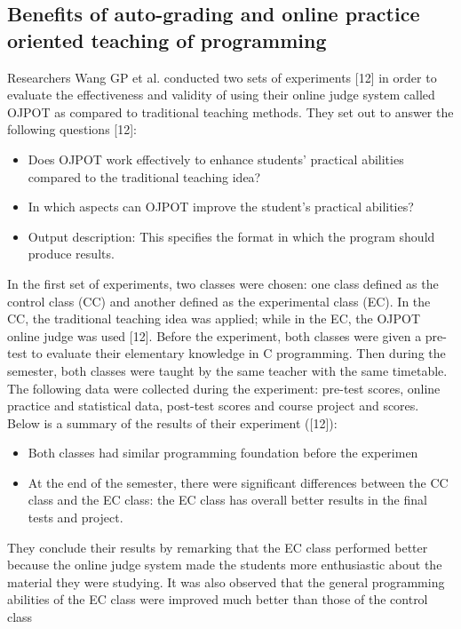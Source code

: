 \documentclass[12pt]{article}
\begin{document}
	\subsection{Benefits of auto-grading and online practice oriented teaching of programming}
		Researchers Wang GP et al. conducted two sets of experiments [12] in order to evaluate the
	effectiveness and validity of using their online judge system called OJPOT as compared to
	traditional teaching methods. They set out to answer the following questions [12]:
		\begin{itemize}
			\item  Does OJPOT work effectively to enhance students’ practical abilities compared to the
					traditional teaching idea?
			\item  In which aspects can OJPOT improve the student’s practical abilities?
			\item Output description: This specifies the format in which the program should produce
				results.
		\end{itemize}
		In the first set of experiments, two classes were chosen: one class defined as the control class (CC)
	and another defined as the experimental class (EC). In the CC, the traditional teaching idea was
	applied; while in the EC, the OJPOT online judge was used [12]. Before the experiment, both
	classes were given a pre-test to evaluate their elementary knowledge in C programming. Then
	during the semester, both classes were taught by the same teacher with the same timetable.
	The following data were collected during the experiment: pre-test scores, online practice and
	statistical data, post-test scores and course project and scores. Below is a summary of the results
	of their experiment ([12]):
		\begin{itemize}
			\item Both classes had similar programming foundation before the experimen
			\item At the end of the semester, there were significant differences between the CC class and
				the EC class: the EC class has overall better results in the final tests and project.
		\end{itemize}
		They conclude their results by remarking that the EC class performed better because the online
	judge system made the students more enthusiastic about the material they were studying. It was
	also observed that the general programming abilities of the EC class were improved much better
	than those of the control class

\newpage
\end{document}
